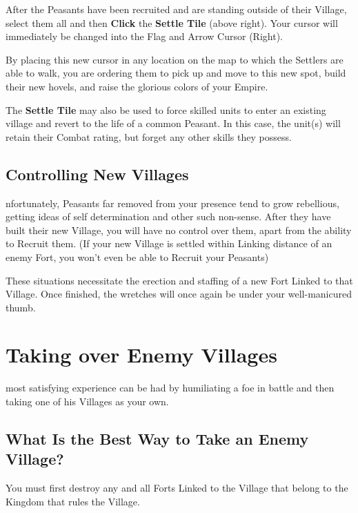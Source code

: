 After the Peasants have been recruited and are standing outside of their Village, select them all and then \textbf{Click} the \textbf{Settle Tile} (above right). Your cursor will immediately be changed into the Flag and Arrow Cursor (Right).

By placing this new cursor in any location on the map to which the Settlers are able to walk, you are ordering them to pick up and move to this new spot, build their new hovels, and raise the glorious colors of your Empire.

The \textbf{Settle Tile} may also be used to force skilled units to enter an existing village and revert to the life of a common Peasant. In this case, the unit(s) will retain their Combat rating, but forget any other skills they possess.

\subsection{Controlling New Villages}


nfortunately, Peasants far removed from your presence tend to grow rebellious, getting ideas of self determination and other such non-sense. After they have built their new Village, you will have no control over them, apart from the ability to Recruit them. (If your new Village is settled within Linking distance of an enemy Fort, you won’t even be able to Recruit your Peasants)

These situations necessitate the erection and staffing of a new Fort Linked to that Village. Once finished, the wretches will once again be under your well-manicured thumb.

\section{Taking over Enemy Villages}


 most satisfying experience can be had by humiliating a foe in battle and then taking one of his Villages as your own.

\subsection{What Is the Best Way to Take an Enemy Village?}

You must first destroy any and all Forts Linked to the Village that belong to the Kingdom that rules the Village.

